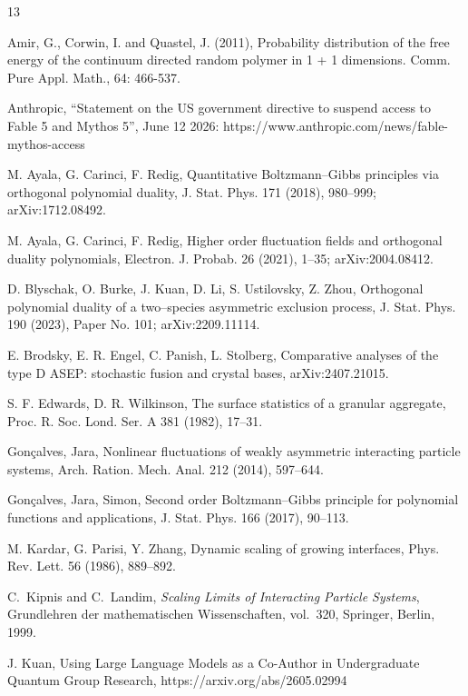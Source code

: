 \documentclass{article}
\begin{document}
\begin{thebibliography}{13}

 Amir, G., Corwin, I. and Quastel, J. (2011), Probability distribution of the free energy of the continuum directed random polymer in 1 + 1 dimensions. Comm. Pure Appl. Math., 64: 466-537. 


 Anthropic, ``Statement on the US government directive to suspend access to Fable 5 and Mythos 5'', June 12 2026: https://www.anthropic.com/news/fable-mythos-access

 M. Ayala, G. Carinci, F. Redig, Quantitative Boltzmann–Gibbs principles via orthogonal polynomial duality, J. Stat. Phys. 171 (2018), 980–999; arXiv:1712.08492.

 M. Ayala, G. Carinci, F. Redig, Higher order fluctuation fields and orthogonal duality polynomials, Electron. J. Probab. 26 (2021), 1–35; arXiv:2004.08412.

 D. Blyschak, O. Burke, J. Kuan, D. Li, S. Ustilovsky, Z. Zhou, Orthogonal polynomial duality of a two–species asymmetric exclusion process, J. Stat. Phys. 190 (2023), Paper No. 101;
arXiv:2209.11114.



E. Brodsky, E. R. Engel, C. Panish, L. Stolberg, Comparative analyses of the type D ASEP:
stochastic fusion and crystal bases, arXiv:2407.21015.

S. F. Edwards, D. R. Wilkinson, The surface statistics of a granular aggregate, Proc. R. Soc. Lond. Ser. A 381 (1982), 17–31.


 Gonçalves, Jara, Nonlinear fluctuations of weakly asymmetric interacting particle systems, Arch. Ration. Mech. Anal. 212 (2014), 597–644.
  
 Gonçalves, Jara, Simon, Second order Boltzmann–Gibbs principle for polynomial functions and applications, J. Stat. Phys. 166 (2017), 90–113.
  
  
M. Kardar, G. Parisi, Y. Zhang, Dynamic scaling of growing interfaces, Phys. Rev. Lett. 56 (1986), 889–892.

C.~Kipnis and C.~Landim,
\textit{Scaling Limits of Interacting Particle Systems},
Grundlehren der mathematischen Wissenschaften, vol.~320,
Springer, Berlin, 1999.

J. Kuan, Using Large Language Models as a Co-Author in Undergraduate Quantum Group Research, https://arxiv.org/abs/2605.02994




\end{thebibliography}
\end{document}
